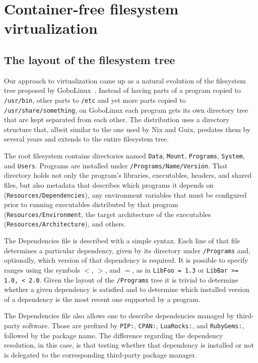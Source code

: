 \documentclass[sigplan, anonymous, 10pt]{acmart}
\begin{document}
\section{Container-free filesystem virtualization}

\subsection{The layout of the filesystem tree}
Our approach to virtualization came up as a natural evolution of the filesystem tree proposed
by GoboLinux~\cite{GoboLinux}. Instead of having parts of a program copied to \texttt{/usr/bin},
other parts to \texttt{/etc} and yet more parts copied to \texttt{/usr/share/something}, on
GoboLinux each program gets its own directory tree that are kept separated from each other.
The distribution uses a directory structure that, albeit similar to the one used by Nix and
Guix, predates them by several years and extends to the entire filesystem tree.

The root filesystem contains directories named \texttt{Data}, \texttt{Mount}, \texttt{Programs},
\texttt{System}, and \texttt{Users}. Programs are installed under \texttt{/Programs/Name/Version}.
That directory holds not only the program's libraries, executables, headers, and shared files, but
also metadata that describes which programs it depends on (\texttt{Resources/Dependencies}), any
environment variables that must be configured prior to running executables distributed by that
program (\texttt{Resources/Environment}, the target architecture of the executables
(\texttt{Resources/Architecture}), and others.

The Dependencies file is described with a simple syntax. Each line of that file determines
a particular dependency, given by its directory under \texttt{/Programs} and, optionally,
which version of that dependency is required. It is possible to specify ranges using the
symbols $<$, $>$, and $=$, as in \texttt{LibFoo = 1.3} or \texttt{LibBar >= 1.0, < 2.0}.
Given the layout of the \texttt{/Programs} tree it is trivial to determine whether a given
dependency is satisfied and to determine which installed version of a dependency is the most
recent one supported by a program.

The Dependencies file also allows one to describe dependencies managed by third-party
software. Those are prefixed by \texttt{PIP:}, \texttt{CPAN:}, \texttt{LuaRocks:}, and
\texttt{RubyGems:}, followed by the package name. The difference regarding the dependency
resolution, in this case, is that testing whether that dependency is installed or not is
delegated to the corresponding third-party package manager.
\end{document}
